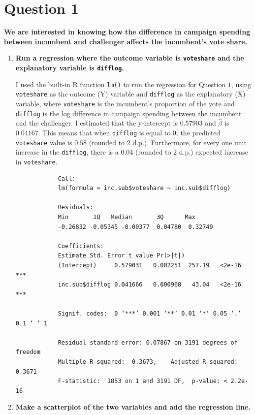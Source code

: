 \documentclass[12pt,letterpaper]{article}
\begin{document}
\section*{Question 1}
\vspace{.25cm}
\noindent \textbf{We are interested in knowing how the difference in campaign spending between incumbent and challenger affects the incumbent's vote share.}
	\begin{enumerate}
		\item \textbf{Run a regression where the outcome variable is \texttt{voteshare} and the explanatory variable is \texttt{difflog}.}	\vspace{0cm}
		
		I used the built-in R function \texttt{lm()} to run the regression for Question $1$, using \texttt{voteshare} as the outcome (Y) variable and \texttt{difflog} as the explanatory (X) variable, where \texttt{voteshare} is the incumbent's proportion of the vote and \texttt{difflog} is the log difference in campaign spending between the incumbent and the challenger. I estimated that the y-intercept is $0.57903$ and $\hat{\beta}$ is $0.04167$. This means that when \texttt{difflog} is equal to 0, the predicted \texttt{voteshare} value is $0.58$ (rounded to $2$ d.p.). Furthermore, for every one unit increase in the \texttt{difflog}, there is a $0.04$ (rounded to $2$ d.p.) expected increase in \texttt{voteshare}.
		
		 
		
		\begin{verbatim}
			Call:
			lm(formula = inc.sub$voteshare ~ inc.sub$difflog)
			
			Residuals:
			Min       1Q   Median       3Q      Max 
			-0.26832 -0.05345 -0.00377  0.04780  0.32749 
			
			Coefficients:
			Estimate Std. Error t value Pr(>|t|)    
			(Intercept)     0.579031   0.002251  257.19   <2e-16 ***
			inc.sub$difflog 0.041666   0.000968   43.04   <2e-16 ***
			---
			Signif. codes:  0 ‘***’ 0.001 ‘**’ 0.01 ‘*’ 0.05 ‘.’ 0.1 ‘ ’ 1
			
			Residual standard error: 0.07867 on 3191 degrees of freedom
			Multiple R-squared:  0.3673,	Adjusted R-squared:  0.3671 
			F-statistic:  1853 on 1 and 3191 DF,  p-value: < 2.2e-16
		\end{verbatim}
		
		\item \textbf{Make a scatterplot of the two variables and add the regression line.} 	\vspace{0cm}
		

\end{enumerate}
\end{document}
